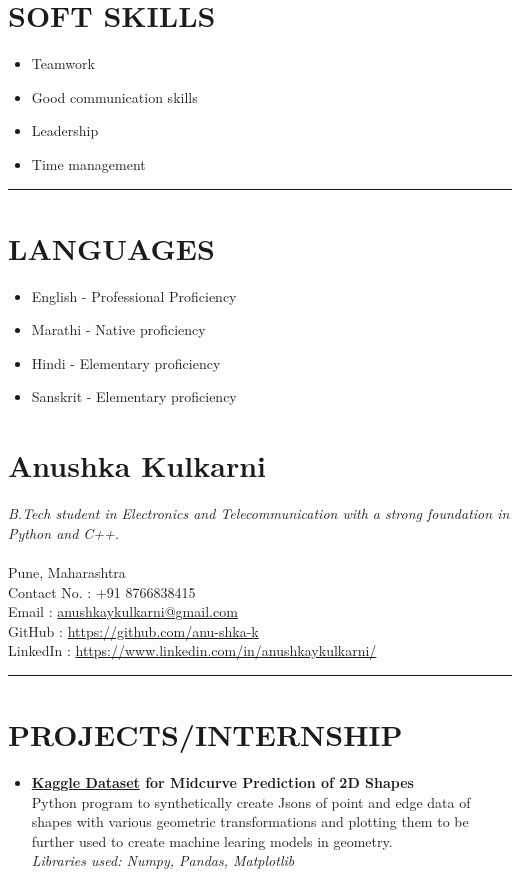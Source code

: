 \documentclass[a4paper,10pt]{article}
\begin{document}
\begin{paracol}{2}
\begin{leftcolumn*}
	\section*{SOFT SKILLS}
	\begin{itemize}
		\item Teamwork
		\item Good communication skills
		\item Leadership
		\item Time management
	\end{itemize}
	\vspace{0.1em}
	\hrule
	\section*{LANGUAGES}
	\begin{itemize}
		\item English - Professional Proficiency
		\item Marathi - Native proficiency
		\item Hindi - Elementary proficiency
		\item Sanskrit - Elementary proficiency
	\end{itemize}

\end{leftcolumn*}

\switchcolumn

	\section*{\Huge Anushka Kulkarni}
		\textit{B.Tech student in Electronics and Telecommunication with a strong foundation in Python and C++.} \\ \\
		Pune, Maharashtra  \\
		Contact No. : +91 8766838415  \\
		Email : \href {anushkaykulkarni@gmail.com}{anushkaykulkarni@gmail.com} \\
		GitHub : \href {https://github.com/anu-shka-k}{https://github.com/anu-shka-k}  \\
		LinkedIn : \href {https://www.linkedin.com/in/anushkaykulkarni/}{https://www.linkedin.com/in/anushkaykulkarni/}  \\
		
		\hrule
		
	\section*{PROJECTS/INTERNSHIP}
		\begin{itemize}
		\item \textbf{\href{https://www.kaggle.com/datasets/anushkaykulkarni/midcurvenn-linegraphs}{Kaggle Dataset} for Midcurve Prediction of 2D Shapes} \\
		Python program to synthetically create Jsons of point and edge data of shapes with various geometric transformations and plotting them to be further used to create machine learing models in geometry. \\
		\textit{Libraries used: Numpy, Pandas, Matplotlib}
		

\end{itemize}
\end{paracol}
\end{document}
